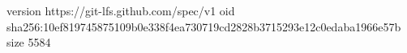 version https://git-lfs.github.com/spec/v1
oid sha256:10ef819745875109b0e338f4ea730719cd2828b3715293e12c0edaba1966e57b
size 5584
